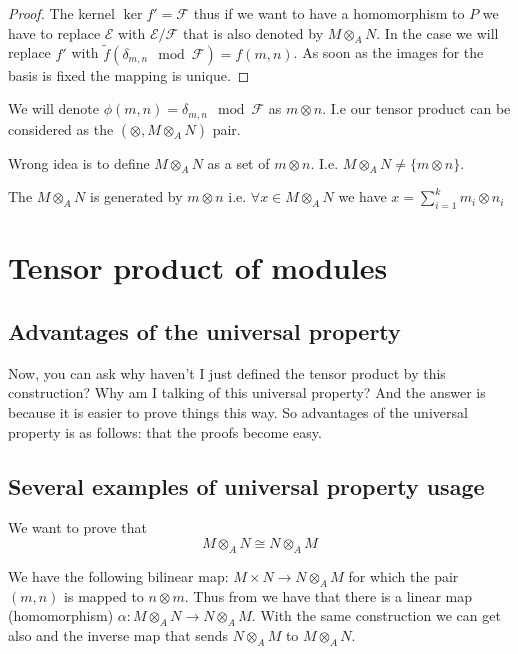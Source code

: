 \begin{lemma}
\begin{proof}
    The kernel $\ker f' = \mathcal{F}$ thus if we want to have a
    homomorphism to $P$ we have to replace $\mathcal{E}$ with
    $\mathcal{E}/\mathcal{F}$ that is also denoted by
    $M \otimes_A N$. In the case we will replace $f'$ with
    $\tilde{f}\left(\delta_{m,n} \mod \mathcal{F}\right) = f(m,n)$. As
    soon as the images for the basis is fixed the mapping is unique.
  \end{proof}
  \label{lem:tensorproductexistence}
\end{lemma}

We will denote $\phi\left(m,n\right) = \delta_{m,n} \mod \mathcal{F}$ as
$m \otimes n$. I.e our tensor product can be considered as the 
$\left(\otimes, M \otimes_A N\right)$ pair.


\begin{remark}
  Wrong idea is to define $M \otimes_A N$
  as a set of $m \otimes n$. I.e.
  $M \otimes_A N \neq \{m \otimes n\}$.
\end{remark}
The $M \otimes_A N$ is generated by $m \otimes n$ i.e.
$\forall x \in M \otimes_A N$ we have $x = \sum_{i = 1}^k m_i \otimes n_i$

\section{Tensor product of modules}

\subsection{Advantages of the universal property}
Now, you can ask  why haven't I just defined the tensor product by
this construction? Why am I talking of this universal property? 
And the answer is because it is easier to prove things this way. 
So advantages of the universal property is as follows: that the proofs
become easy.

\subsection{Several examples of universal property usage}

\begin{example}
  We want to prove that
  \[
  M \otimes_A N \cong N \otimes_A M
  \]

  We have the following bilinear map:
  $M \times N \to N \otimes_A M$ for which the pair
  $(m,n)$ is mapped to $n \otimes m$. Thus from
   we have that there is a linear map
  (homomorphism)
  $\alpha: M \otimes_A N \to N \otimes_A M$. With the same
  construction we can get also and the inverse map that sends
  $N \otimes_A M$ to $M \otimes_A N$.
\end{example}

